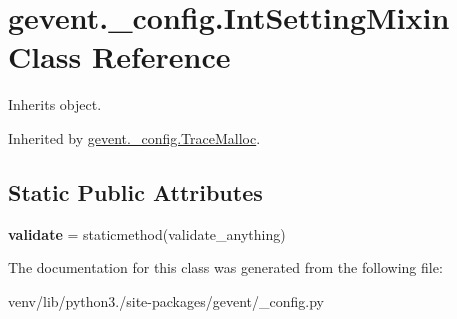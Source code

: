 \hypertarget{classgevent_1_1__config_1_1_int_setting_mixin}{}\section{gevent.\+\_\+config.\+Int\+Setting\+Mixin Class Reference}
\label{classgevent_1_1__config_1_1_int_setting_mixin}


Inherits object.



Inherited by \hyperlink{classgevent_1_1__config_1_1_trace_malloc}{gevent.\+\_\+config.\+Trace\+Malloc}.

\subsection*{Static Public Attributes}
\begin{DoxyCompactItemize}
\item 
\mbox{\label{classgevent_1_1__config_1_1_int_setting_mixin_a9c5e35554b2a2b7af01c03b82cde9f96}} 
{\bfseries validate} = staticmethod(validate\+\_\+anything)
\end{DoxyCompactItemize}


The documentation for this class was generated from the following file\+:\begin{DoxyCompactItemize}
\item 
venv/lib/python3./site-\/packages/gevent/\+\_\+config.\+py\end{DoxyCompactItemize}
